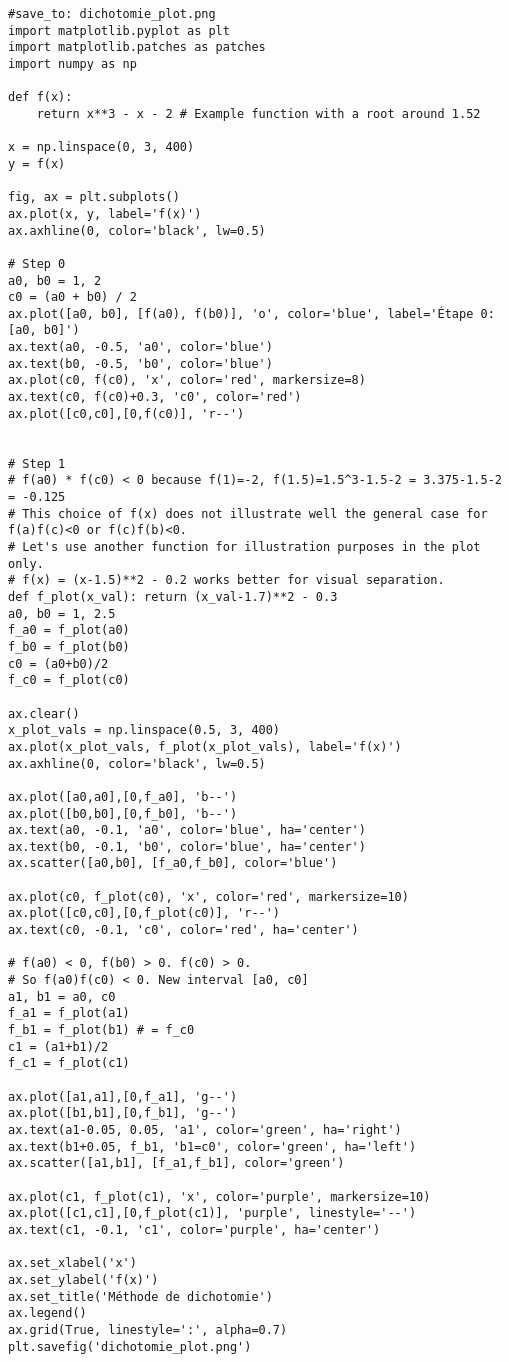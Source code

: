 \begin{verbatim}
#save_to: dichotomie_plot.png
import matplotlib.pyplot as plt
import matplotlib.patches as patches
import numpy as np

def f(x):
    return x**3 - x - 2 # Example function with a root around 1.52

x = np.linspace(0, 3, 400)
y = f(x)

fig, ax = plt.subplots()
ax.plot(x, y, label='f(x)')
ax.axhline(0, color='black', lw=0.5)

# Step 0
a0, b0 = 1, 2
c0 = (a0 + b0) / 2
ax.plot([a0, b0], [f(a0), f(b0)], 'o', color='blue', label='Étape 0: [a0, b0]')
ax.text(a0, -0.5, 'a0', color='blue')
ax.text(b0, -0.5, 'b0', color='blue')
ax.plot(c0, f(c0), 'x', color='red', markersize=8)
ax.text(c0, f(c0)+0.3, 'c0', color='red')
ax.plot([c0,c0],[0,f(c0)], 'r--')


# Step 1
# f(a0) * f(c0) < 0 because f(1)=-2, f(1.5)=1.5^3-1.5-2 = 3.375-1.5-2 = -0.125
# This choice of f(x) does not illustrate well the general case for f(a)f(c)<0 or f(c)f(b)<0.
# Let's use another function for illustration purposes in the plot only.
# f(x) = (x-1.5)**2 - 0.2 works better for visual separation.
def f_plot(x_val): return (x_val-1.7)**2 - 0.3
a0, b0 = 1, 2.5
f_a0 = f_plot(a0)
f_b0 = f_plot(b0)
c0 = (a0+b0)/2
f_c0 = f_plot(c0)

ax.clear()
x_plot_vals = np.linspace(0.5, 3, 400)
ax.plot(x_plot_vals, f_plot(x_plot_vals), label='f(x)')
ax.axhline(0, color='black', lw=0.5)

ax.plot([a0,a0],[0,f_a0], 'b--')
ax.plot([b0,b0],[0,f_b0], 'b--')
ax.text(a0, -0.1, 'a0', color='blue', ha='center')
ax.text(b0, -0.1, 'b0', color='blue', ha='center')
ax.scatter([a0,b0], [f_a0,f_b0], color='blue')

ax.plot(c0, f_plot(c0), 'x', color='red', markersize=10)
ax.plot([c0,c0],[0,f_plot(c0)], 'r--')
ax.text(c0, -0.1, 'c0', color='red', ha='center')

# f(a0) < 0, f(b0) > 0. f(c0) > 0.
# So f(a0)f(c0) < 0. New interval [a0, c0]
a1, b1 = a0, c0
f_a1 = f_plot(a1)
f_b1 = f_plot(b1) # = f_c0
c1 = (a1+b1)/2
f_c1 = f_plot(c1)

ax.plot([a1,a1],[0,f_a1], 'g--')
ax.plot([b1,b1],[0,f_b1], 'g--')
ax.text(a1-0.05, 0.05, 'a1', color='green', ha='right')
ax.text(b1+0.05, f_b1, 'b1=c0', color='green', ha='left')
ax.scatter([a1,b1], [f_a1,f_b1], color='green')

ax.plot(c1, f_plot(c1), 'x', color='purple', markersize=10)
ax.plot([c1,c1],[0,f_plot(c1)], 'purple', linestyle='--')
ax.text(c1, -0.1, 'c1', color='purple', ha='center')

ax.set_xlabel('x')
ax.set_ylabel('f(x)')
ax.set_title('Méthode de dichotomie')
ax.legend()
ax.grid(True, linestyle=':', alpha=0.7)
plt.savefig('dichotomie_plot.png')
\end{verbatim}

